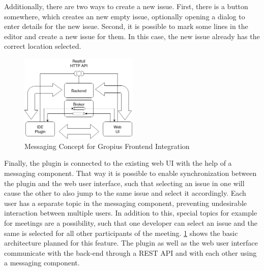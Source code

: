 Additionally, there are two ways to create a new issue.
First, there is a button somewhere, which creates an new empty issue, 
optionally opening a dialog to enter details for the new issue.
Second, it is possible to mark some lines in the editor and create a new issue for them.
In this case, the new issue already has the correct location selected.

\begin{figure}[!h]
	\centering
	\includegraphics[width=0.5\textwidth]{graphics/concept_gropius_frontend_messaging.png}
	\caption{Messaging Concept for Gropius Frontend Integration}
	\label{fig:c3:concept_gropius_messaging}
\end{figure}

Finally, the plugin is connected to the existing web \gls{UI} with the help of a messaging component.
That way it is possible to enable synchronization between the plugin and the web user interface, 
such that selecting an issue in one will cause the other to also jump to the same issue and select it accordingly. 
Each user has a separate topic in the messaging component, preventing undesirable interaction between multiple users. 
In addition to this, special topics for example for meetings are a possibility, 
such that one developer can select an issue and the same is selected for all other participants of the meeting. 
\cref{fig:c3:concept_gropius_messaging} shows the basic architecture planned for this feature. 
The plugin as well as the web user interface communicate with the back-end through a \gls{REST} \gls{API} and with each other using a messaging component.
